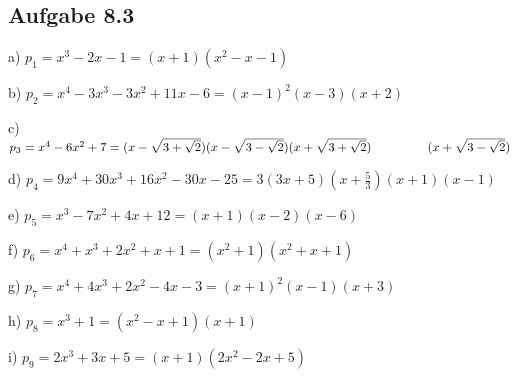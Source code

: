 \documentclass{standalone}
\begin{document}
\subsection{Aufgabe 8.3}


a) $ p_1= x^3 - 2x - 1  = (x+1)(x^2 -x -1)  $


b) $ p_2 = x^4 - 3x^3 - 3x^2 +11x - 6 = (x-1)^2 (x-3) (x + 2) $


c) $p_3= x^4 - 6x^2 + 7 = (x-\sqrt{3+\sqrt2}) (x-\sqrt{3-\sqrt2}) (x+\sqrt{3+\sqrt2})\\\indent\indent\indent(x+\sqrt{3-\sqrt2})$

d) $ p_4 = 9x^4 + 30x^3 + 16x^2 -30x - 25= 3 (3x+5)(x+\frac{5}{3})(x+1)(x-1)$

e) $ p_5= x^3-7x^2+4x+12= (x+1)(x-2)(x-6)$

f) $p_6= x^4+x^3+2x^2+x+1= (x^2+1)(x^2+x+1)$

g) $p_7= x^4+4x^3+2x^2-4x-3=(x+1)^2(x-1)(x+3)$

h) $p_8= x^3+1= (x^2-x+1)(x+1)$

i) $p_9= 2x^3+3x+5= (x+1)(2x^2-2x+5)$
\end{document}
